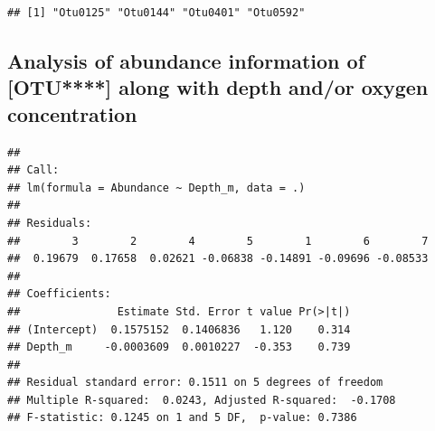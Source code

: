\documentclass[11 pt,]{article}
\newenvironment{Shaded}{\begin{snugshade}}{\end{snugshade}}
\newcommand{\KeywordTok}[1]{\textcolor[rgb]{0.13,0.29,0.53}{\textbf{#1}}}
\newcommand{\DataTypeTok}[1]{\textcolor[rgb]{0.13,0.29,0.53}{#1}}
\newcommand{\StringTok}[1]{\textcolor[rgb]{0.31,0.60,0.02}{#1}}
\newcommand{\OperatorTok}[1]{\textcolor[rgb]{0.81,0.36,0.00}{\textbf{#1}}}
\newcommand{\NormalTok}[1]{#1}
\begin{document}
\begin{verbatim}
## [1] "Otu0125" "Otu0144" "Otu0401" "Otu0592"
\end{verbatim}

\subsection{\texorpdfstring{Analysis of abundance information of
{[}OTU****{]} along with depth and/or oxygen concentration
\label{sec:OTUabundance}}{Analysis of abundance information of {[}OTU****{]} along with depth and/or oxygen concentration }}\label{analysis-of-abundance-information-of-otu-along-with-depth-andor-oxygen-concentration}

\begin{Shaded}
\end{Shaded}

\begin{verbatim}
## 
## Call:
## lm(formula = Abundance ~ Depth_m, data = .)
## 
## Residuals:
##        3        2        4        5        1        6        7 
##  0.19679  0.17658  0.02621 -0.06838 -0.14891 -0.09696 -0.08533 
## 
## Coefficients:
##               Estimate Std. Error t value Pr(>|t|)
## (Intercept)  0.1575152  0.1406836   1.120    0.314
## Depth_m     -0.0003609  0.0010227  -0.353    0.739
## 
## Residual standard error: 0.1511 on 5 degrees of freedom
## Multiple R-squared:  0.0243, Adjusted R-squared:  -0.1708 
## F-statistic: 0.1245 on 1 and 5 DF,  p-value: 0.7386
\end{verbatim}
\end{document}
